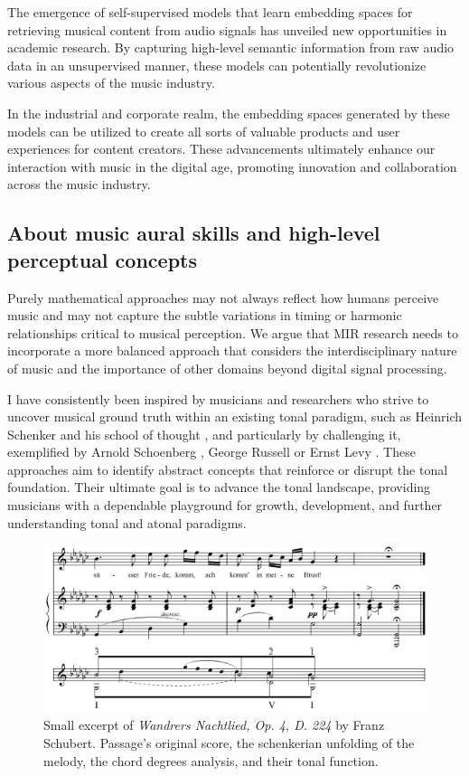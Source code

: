 The emergence of self-supervised models that learn embedding spaces for retrieving musical content from audio signals has unveiled new opportunities in academic research. By capturing high-level semantic information from raw audio data in an unsupervised manner, these models can potentially revolutionize various aspects of the music industry.

In the industrial and corporate realm, the embedding spaces generated by these models can be utilized to create all sorts of valuable products and user experiences for content creators. These advancements ultimately enhance our interaction with music in the digital age, promoting innovation and collaboration across the music industry.

\subsection{About music aural skills and high-level perceptual concepts}

Purely mathematical approaches may not always reflect how humans perceive music and may not capture the subtle variations in timing or harmonic relationships critical to musical perception. We argue that MIR research needs to incorporate a more balanced approach that considers the interdisciplinary nature of music and the importance of other domains beyond digital signal processing.

I have consistently been inspired by musicians and researchers who strive to uncover musical ground truth within an existing tonal paradigm, such as Heinrich Schenker and his school of thought \cite{Komar1959SchenkersStructure}, and particularly by challenging it, exemplified by Arnold Schoenberg \cite{Samson1974SchoenbergsMusic}, George Russell \cite{LydianRussell} or Ernst Levy \cite{LevyAHarmony}. These approaches aim to identify abstract concepts that reinforce or disrupt the tonal foundation. Their ultimate goal is to advance the tonal landscape, providing musicians with a dependable playground for growth, development, and further understanding tonal and atonal paradigms.


\begin{figure}[ht]
\includegraphics[clip,width=\columnwidth]{figures/schenkerian analysis/SchubertOp4no3.png}%
\caption[Excerpt of \textit{Wandrers Nachtlied, Op. 4, D. 224} by Franz Schubert.]{\small{Small excerpt of \textit{Wandrers Nachtlied, Op. 4, D. 224} by Franz Schubert. Passage's original score, the schenkerian unfolding of the melody, the chord degrees analysis, and their tonal function.}}
\label{fig:Wandrers Nachtlied, Op. 4, D. 224}
\end{figure}